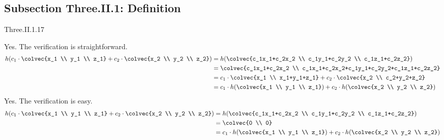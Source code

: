 \subsection{Subsection Three.II.1: Definition}
\begin{ans}{Three.II.1.17}
      \begin{exparts}
        \partsitem Yes.
          The verification is straightforward.
          \begin{align*}
            h( c_1\cdot\colvec{x_1 \\ y_1 \\ z_1}
               +c_2\cdot\colvec{x_2 \\ y_2 \\ z_2} )
            &=h( \colvec{c_1x_1+c_2x_2 \\ c_1y_1+c_2y_2 \\ c_1z_1+c_2z_2} ) \\
            &=\colvec{c_1x_1+c_2x_2 \\
                     c_1x_1+c_2x_2+c_1y_1+c_2y_2+c_1z_1+c_2z_2}          \\
            &=c_1\cdot\colvec{x_1 \\ x_1+y_1+z_1}
               +c_2\cdot\colvec{x_2 \\ c_2+y_2+z_2}                       \\
            &=c_1\cdot h(\colvec{x_1 \\ y_1 \\ z_1})
               +c_2\cdot h(\colvec{x_2 \\ y_2 \\ z_2})
          \end{align*}
        \partsitem Yes.
          The verification is easy.
          \begin{align*}
            h(c_1\cdot\colvec{x_1 \\ y_1 \\ z_1}
              +c_2\cdot\colvec{x_2 \\ y_2 \\ z_2})
            &=h( \colvec{c_1x_1+c_2x_2 \\ c_1y_1+c_2y_2 \\ c_1z_1+c_2z_2} ) \\
            &=\colvec{0 \\ 0}                                              \\
            &=c_1\cdot h(\colvec{x_1 \\ y_1 \\ z_1})
               +c_2\cdot h(\colvec{x_2 \\ y_2 \\ z_2})

\end{align*}
\end{exparts}
\end{ans}
